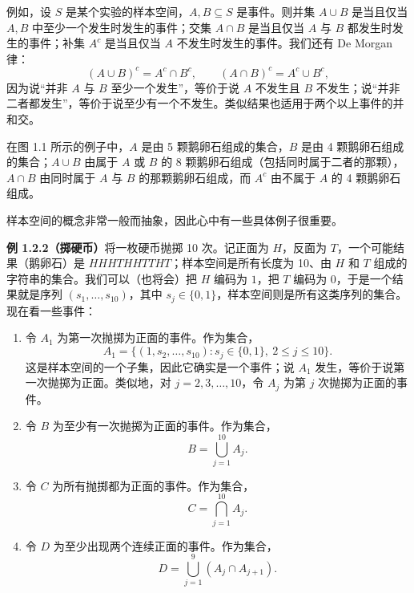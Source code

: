 \documentclass[UTF8, 12pt, fontset=fandol, oneside]{ctexart}
\begin{document}
例如，设 $S$ 是某个实验的样本空间，$A,B\subseteq S$ 是事件。则并集 $A\cup B$ 是当且仅当 $A,B$ 中至少一个发生时发生的事件；交集 $A\cap B$ 是当且仅当 $A$ 与 $B$ 都发生时发生的事件；补集 $A^c$ 是当且仅当 $A$ 不发生时发生的事件。我们还有 De Morgan 律：
\[
  (A\cup B)^c=A^c\cap B^c,\qquad (A\cap B)^c=A^c\cup B^c,
\]
因为说“并非 $A$ 与 $B$ 至少一个发生”，等价于说 $A$ 不发生且 $B$ 不发生；说“并非二者都发生”，等价于说至少有一个不发生。类似结果也适用于两个以上事件的并和交。

在图 1.1 所示的例子中，$A$ 是由 5 颗鹅卵石组成的集合，$B$ 是由 4 颗鹅卵石组成的集合；$A\cup B$ 由属于 $A$ 或 $B$ 的 8 颗鹅卵石组成（包括同时属于二者的那颗），$A\cap B$ 由同时属于 $A$ 与 $B$ 的那颗鹅卵石组成，而 $A^c$ 由不属于 $A$ 的 4 颗鹅卵石组成。

样本空间的概念非常一般而抽象，因此心中有一些具体例子很重要。

\noindent\textbf{例 1.2.2（掷硬币）}\quad 将一枚硬币抛掷 10 次。记正面为 $H$，反面为 $T$，一个可能结果（鹅卵石）是 $HHHTHHTTHT$；样本空间是所有长度为 10、由 $H$ 和 $T$ 组成的字符串的集合。我们可以（也将会）把 $H$ 编码为 $1$，把 $T$ 编码为 $0$，于是一个结果就是序列 $(s_1,\ldots,s_{10})$，其中 $s_j\in\{0,1\}$，样本空间则是所有这类序列的集合。现在看一些事件：

\begin{enumerate}
  \item 令 $A_1$ 为第一次抛掷为正面的事件。作为集合，
  \[
    A_1=\{(1,s_2,\ldots,s_{10}):s_j\in\{0,1\},\ 2\le j\le 10\}.
  \]
  这是样本空间的一个子集，因此它确实是一个事件；说 $A_1$ 发生，等价于说第一次抛掷为正面。类似地，对 $j=2,3,\ldots,10$，令 $A_j$ 为第 $j$ 次抛掷为正面的事件。

  \item 令 $B$ 为至少有一次抛掷为正面的事件。作为集合，
  \[
    B=\bigcup_{j=1}^{10} A_j.
  \]

  \item 令 $C$ 为所有抛掷都为正面的事件。作为集合，
  \[
    C=\bigcap_{j=1}^{10} A_j.
  \]

  \item 令 $D$ 为至少出现两个连续正面的事件。作为集合，
  \[
    D=\bigcup_{j=1}^{9}(A_j\cap A_{j+1}).
  \]
\end{enumerate}
\end{document}
